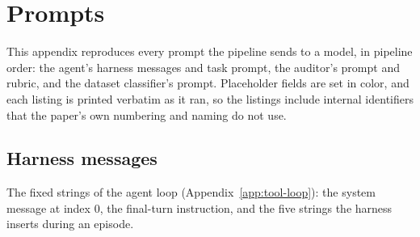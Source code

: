 \section{Prompts}
\label{app:prompt-listings}

This appendix reproduces every prompt the pipeline sends to a model, in
pipeline order: the agent's harness messages and task prompt, the auditor's
prompt and rubric, and the dataset classifier's prompt. Placeholder fields
are set in color, and each listing is printed verbatim as it ran, so the
listings include internal identifiers that the paper's own numbering and
naming do not use.

\subsection{Harness messages}
The fixed strings of the agent loop (Appendix~\ref{app:tool-loop}): the
system message at index 0, the final-turn instruction, and the five strings
the harness inserts during an episode.

